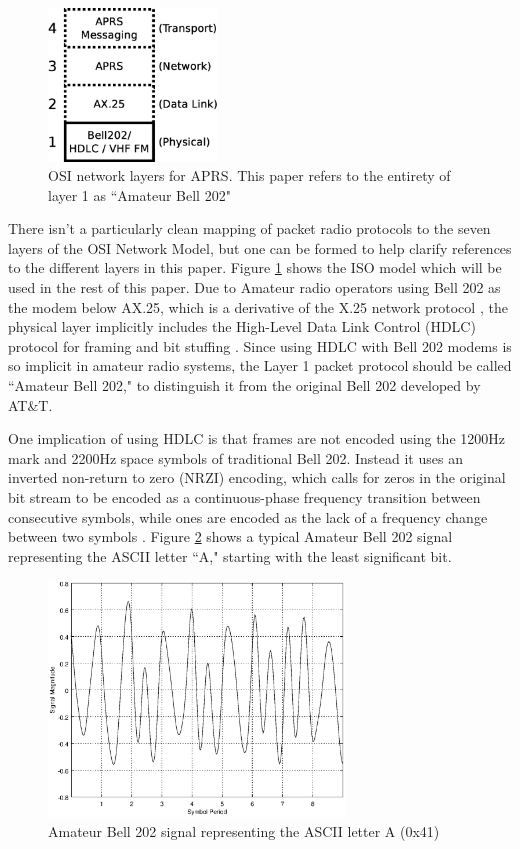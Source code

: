 \begin{figure}[!b]
	\centering
	\includegraphics[width=0.4\textwidth]{src/dia/osi_bell202}
	\caption{OSI network layers for APRS. 
	This paper refers to the entirety of layer 1 as ``Amateur Bell 202"}
	\label{fig:osibell}
\end{figure}

There isn't a particularly clean
mapping of packet radio protocols to the seven layers of the OSI
Network Model, but one can be formed 
to help clarify references to the different layers in this paper.
Figure \ref{fig:osibell} shows the ISO model which will be used in
the rest of this paper.
Due to Amateur radio operators
using Bell 202 as the modem below AX.25, which is a derivative of
the X.25 network protocol \cite[\S1.1]{ax25spec}, 
the physical layer implicitly includes the High-Level Data Link Control (HDLC) 
protocol for framing and bit stuffing \cite{n1vgphy}.
Since using HDLC with Bell 202 modems is so implicit in amateur radio systems, 
the Layer 1 packet protocol should be called ``Amateur Bell 202," to
distinguish it from the original Bell 202 developed by AT\&T.

One implication of using HDLC is that frames are not encoded using the
1200Hz mark and 2200Hz space symbols of traditional Bell 202.
Instead it uses an
inverted non-return to zero (NRZI) encoding,
which calls for zeros in the original bit stream to be encoded as a
continuous-phase frequency transition between consecutive symbols, 
while ones are encoded as
the lack of a frequency change between two symbols \cite{iso13239}.
Figure \ref{fig:bell202sample} shows a typical Amateur Bell 202
signal representing the ASCII letter ``A," starting with the least significant bit.

\begin{figure}
	\centering
	\includegraphics[width=0.7\textwidth]{src/octave/bell202A}
	\caption{Amateur Bell 202 signal representing the ASCII letter A (0x41)}
	\label{fig:bell202sample}
\end{figure}


